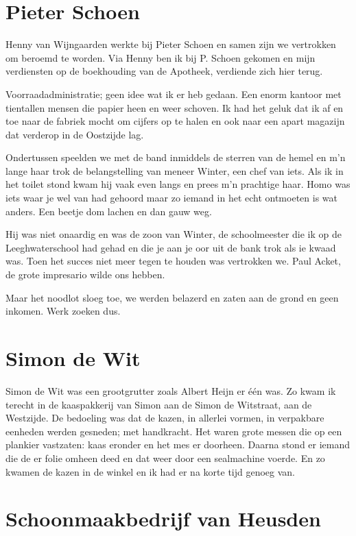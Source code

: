 \documentclass[10pt,twoside,openright]{memoir}
\begin{document}
\chapter{Pieter Schoen} %
\label{cha:schoen}

Henny van Wijngaarden werkte bij Pieter Schoen en samen zijn we vertrokken om beroemd te worden. Via Henny ben ik bij P. Schoen gekomen en mijn verdiensten op de boekhouding van de Apotheek, verdiende zich hier terug. 

Voorraadadministratie; geen idee wat ik er heb gedaan. Een enorm kantoor met tientallen mensen die papier heen en weer schoven. Ik had het geluk dat ik af en toe naar de fabriek mocht om cijfers op te halen en ook naar een apart magazijn dat verderop in de Oostzijde lag. 

Ondertussen speelden we met de band inmiddels de sterren van de hemel en m’n lange haar trok de belangstelling van meneer Winter, een chef van iets. Als ik in het toilet stond kwam hij vaak even langs en prees m’n prachtige haar. Homo was iets waar je wel van had gehoord maar zo iemand in het echt ontmoeten is wat anders. Een beetje dom lachen en dan gauw weg. 

Hij was niet onaardig en was de zoon van Winter, de schoolmeester die ik op de Leeghwaterschool had gehad en die je aan je oor uit de bank trok als ie kwaad was. Toen het succes niet meer tegen te houden was vertrokken we. Paul Acket, de grote impresario wilde ons hebben.

Maar het noodlot sloeg toe, we werden belazerd en zaten aan de grond en geen inkomen. Werk zoeken dus.

\chapter{Simon de Wit} %
\label{cha:wit}

Simon de Wit was een grootgrutter zoals Albert Heijn er één was. Zo kwam ik terecht in de kaaspakkerij van Simon aan de Simon de Witstraat, aan de Westzijde. De bedoeling was dat de kazen, in allerlei vormen, in verpakbare eenheden werden gesneden; met handkracht. Het waren grote messen die op een plankier vastzaten: kaas eronder en het mes er doorheen. Daarna stond er iemand die de er folie omheen deed en dat weer door een sealmachine voerde. En zo kwamen de kazen in de winkel en ik had er na korte tijd genoeg van.

\chapter{Schoonmaakbedrijf van Heusden} %
\label{cha:schoonmaakbedrijf}
\end{document}
